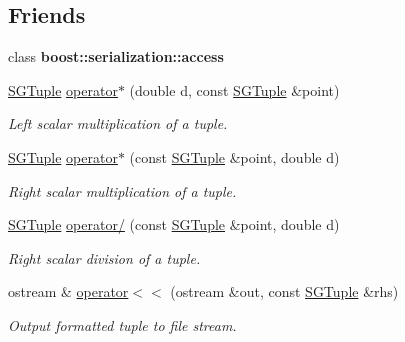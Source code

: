 \subsection*{Friends}
\begin{DoxyCompactItemize}
\item 
\mbox{\label{classSGTuple_ac98d07dd8f7b70e16ccb9a01abf56b9c}} 
class {\bfseries boost\+::serialization\+::access}
\item 
\mbox{\label{classSGTuple_a774881a3412a621df63ed3454a2923a3}} 
\hyperlink{classSGTuple}{S\+G\+Tuple} \hyperlink{classSGTuple_a774881a3412a621df63ed3454a2923a3}{operator$\ast$} (double d, const \hyperlink{classSGTuple}{S\+G\+Tuple} \&point)
\begin{DoxyCompactList}\small\item\em Left scalar multiplication of a tuple. \end{DoxyCompactList}\item 
\mbox{\label{classSGTuple_ab4926e79ee6cfcb52928edfee5f7aea6}} 
\hyperlink{classSGTuple}{S\+G\+Tuple} \hyperlink{classSGTuple_ab4926e79ee6cfcb52928edfee5f7aea6}{operator$\ast$} (const \hyperlink{classSGTuple}{S\+G\+Tuple} \&point, double d)
\begin{DoxyCompactList}\small\item\em Right scalar multiplication of a tuple. \end{DoxyCompactList}\item 
\mbox{\label{classSGTuple_a7862330b9a1f30c6d906bdff1fe3af32}} 
\hyperlink{classSGTuple}{S\+G\+Tuple} \hyperlink{classSGTuple_a7862330b9a1f30c6d906bdff1fe3af32}{operator/} (const \hyperlink{classSGTuple}{S\+G\+Tuple} \&point, double d)
\begin{DoxyCompactList}\small\item\em Right scalar division of a tuple. \end{DoxyCompactList}\item 
\mbox{\label{classSGTuple_ab3a68f1151e2d11c7eca54a64c9d4a7b}} 
ostream \& \hyperlink{classSGTuple_ab3a68f1151e2d11c7eca54a64c9d4a7b}{operator$<$$<$} (ostream \&out, const \hyperlink{classSGTuple}{S\+G\+Tuple} \&rhs)
\begin{DoxyCompactList}\small\item\em Output formatted tuple to file stream. \end{DoxyCompactList}\end{DoxyCompactItemize}


